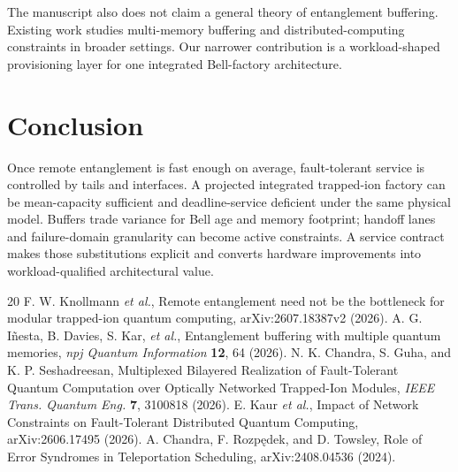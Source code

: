 \documentclass[aps,prx,reprint,superscriptaddress,nofootinbib,longbibliography,floatfix]{revtex4-2}
\begin{document}
The manuscript also does not claim a general theory of entanglement buffering. Existing work studies multi-memory buffering and distributed-computing constraints in broader settings. Our narrower contribution is a workload-shaped provisioning layer for one integrated Bell-factory architecture.

\section{Conclusion}
Once remote entanglement is fast enough on average, fault-tolerant service is controlled by tails and interfaces. A projected integrated trapped-ion factory can be mean-capacity sufficient and deadline-service deficient under the same physical model. Buffers trade variance for Bell age and memory footprint; handoff lanes and failure-domain granularity can become active constraints. A service contract makes those substitutions explicit and converts hardware improvements into workload-qualified architectural value.

\begin{thebibliography}{20}
 F. W. Knollmann \emph{et al.}, Remote entanglement need not be the bottleneck for modular trapped-ion quantum computing, arXiv:2607.18387v2 (2026).
 A. G. I\~nesta, B. Davies, S. Kar, \emph{et al.}, Entanglement buffering with multiple quantum memories, \emph{npj Quantum Information} \textbf{12}, 64 (2026).
 N. K. Chandra, S. Guha, and K. P. Seshadreesan, Multiplexed Bilayered Realization of Fault-Tolerant Quantum Computation over Optically Networked Trapped-Ion Modules, \emph{IEEE Trans. Quantum Eng.} \textbf{7}, 3100818 (2026).
 E. Kaur \emph{et al.}, Impact of Network Constraints on Fault-Tolerant Distributed Quantum Computing, arXiv:2606.17495 (2026).
 A. Chandra, F. Rozp\k{e}dek, and D. Towsley, Role of Error Syndromes in Teleportation Scheduling, arXiv:2408.04536 (2024).
\end{thebibliography}
\end{document}
